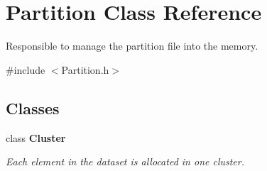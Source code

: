 \hypertarget{classPartition}{
\section{Partition Class Reference}
\label{classPartition}
}


Responsible to manage the partition file into the memory.  


{\ttfamily \#include $<$Partition.h$>$}\subsection*{Classes}
\begin{DoxyCompactItemize}
\item 
class {\bfseries Cluster}
\begin{DoxyCompactList}\small\item\em Each element in the dataset is allocated in one cluster. \item\end{DoxyCompactList}\end{DoxyCompactItemize}
